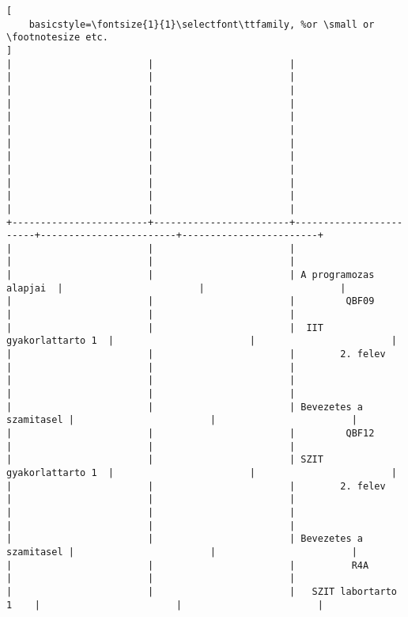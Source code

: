 \begin{lstlisting}[
    basicstyle=\fontsize{1}{1}\selectfont\ttfamily, %or \small or \footnotesize etc.
]
|                        |                        |                        |                        |                        | 
|                        |                        |                        |                        |                        | 
|                        |                        |                        |                        |                        | 
|                        |                        |                        |                        |                        | 
|                        |                        |                        |                        |                        | 
|                        |                        |                        |                        |                        | 
+------------------------+------------------------+------------------------+------------------------+------------------------+
|                        |                        |                        |                        |                        | 
|                        |                        | A programozas alapjai  |                        |                        | 
|                        |                        |         QBF09          |                        |                        | 
|                        |                        |  IIT gyakorlattarto 1  |                        |                        | 
|                        |                        |        2. felev        |                        |                        | 
|                        |                        |                        |                        |                        | 
|                        |                        | Bevezetes a szamitasel |                        |                        | 
|                        |                        |         QBF12          |                        |                        | 
|                        |                        | SZIT gyakorlattarto 1  |                        |                        | 
|                        |                        |        2. felev        |                        |                        | 
|                        |                        |                        |                        |                        | 
|                        |                        | Bevezetes a szamitasel |                        |                        | 
|                        |                        |          R4A           |                        |                        | 
|                        |                        |   SZIT labortarto 1    |                        |                        | 

\end{lstlisting}
